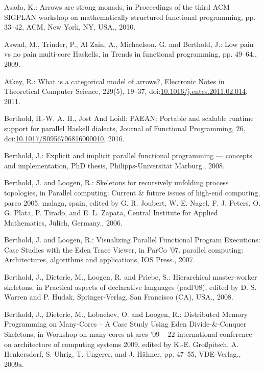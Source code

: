 \documentclass[paper=A4,twoside=true,openright,parskip=full,chapterprefix=true,headings=normal,bibliography=totoc,listof=totoc,titlepage=on,captions=tableabove,draft=false,british]{scrreprt}%
\begin{document}
\leavevmode\hypertarget{ref-Asada:2010:ASM:1863597.1863607}{}%
Asada, K.: Arrows are strong monads, in Proceedings of the third ACM
SIGPLAN workshop on mathematically structured functional programming,
pp. 33--42, ACM, New York, NY, USA., 2010.

\leavevmode\hypertarget{ref-aswad2009low}{}%
Aswad, M., Trinder, P., Al Zain, A., Michaelson, G. and Berthold, J.:
Low pain vs no pain multi-core Haskells, in Trends in functional
programming, pp. 49--64., 2009.

\leavevmode\hypertarget{ref-ATKEY201119}{}%
Atkey, R.: What is a categorical model of arrows?, Electronic Notes in
Theoretical Computer Science, 229(5), 19--37,
doi:\href{https://doi.org/10.1016/j.entcs.2011.02.014}{10.1016/j.entcs.2011.02.014},
2011.

\leavevmode\hypertarget{ref-berthold_loidl_hammond_2016}{}%
Berthold, H.-W. A. H., Jost And Loidl: PAEAN: Portable and scalable
runtime support for parallel Haskell dialects, Journal of Functional
Programming, 26,\\
doi:\href{https://doi.org/10.1017/S0956796816000010}{10.1017/S0956796816000010},
2016.

\leavevmode\hypertarget{ref-JostThesis}{}%
Berthold, J.: Explicit and implicit parallel functional programming ---
concepts and implementation, PhD thesis, Philipps-Universität Marburg.,
2008.

\leavevmode\hypertarget{ref-Eden:PARCO05}{}%
Berthold, J. and Loogen, R.: Skeletons for recursively unfolding process
topologies, in Parallel computing: Current \& future issues of high-end
computing, parco 2005, malaga, spain, edited by G. R. Joubert, W. E.
Nagel, F. J. Peters, O. G. Plata, P. Tirado, and E. L. Zapata, Central
Institute for Applied Mathematics, Jülich, Germany., 2006.

\leavevmode\hypertarget{ref-Berthold2007a}{}%
Berthold, J. and Loogen, R.: Visualizing Parallel Functional Program
Executions: Case Studies with the Eden Trace Viewer, in ParCo '07.
parallel computing: Architectures, algorithms and applications, IOS
Press., 2007.

\leavevmode\hypertarget{ref-PADL08HMWS}{}%
Berthold, J., Dieterle, M., Loogen, R. and Priebe, S.: Hierarchical
master-worker skeletons, in Practical aspects of declarative languages
(padl'08), edited by D. S. Warren and P. Hudak, Springer-Verlag, San
Francisco (CA), USA., 2008.

\leavevmode\hypertarget{ref-arcs-dc}{}%
Berthold, J., Dieterle, M., Lobachev, O. and Loogen, R.: Distributed
Memory Programming on Many-Cores -- A Case Study Using Eden
Divide-\&-Conquer Skeletons, in Workshop on many-cores at arcs '09 -- 22
international conference on architecture of computing systems 2009,
edited by K.-E. Großpitsch, A. Henkersdorf, S. Uhrig, T. Ungerer, and J.
Hähner, pp. 47--55, VDE-Verlag., 2009a.
\end{document}
